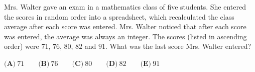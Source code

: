 Mrs. Walter gave an exam in a mathematics class of five students. She entered the scores in random order into a spreadsheet, which recalculated the class average after each score was entered. Mrs. Walter noticed that after each score was entered, the average was always an integer. The scores (listed in ascending order) were $71$, $76$, $80$, $82$ and $91$. What was the last score Mrs. Walter entered?

$\textbf{(A)}\ 71 \qquad \textbf{(B)}\ 76 \qquad \textbf{(C)}\ 80 \qquad \textbf{(D)}\ 82 \qquad \textbf{(E)}\ 91$
